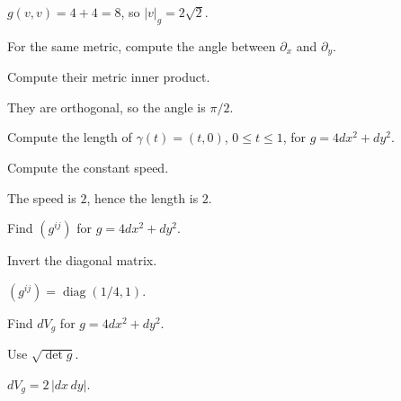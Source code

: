 \begin{solution}
\(g(v,v)=4+4=8\), so \(|v|_g=2\sqrt2\).
\end{solution}

\begin{exercise}[Angle]\label{exr:vii20-ped-02}
For the same metric, compute the angle between \(\partial_x\) and \(\partial_y\).
\end{exercise}

\begin{hint}
Compute their metric inner product.
\end{hint}

\begin{solution}
They are orthogonal, so the angle is \(\pi/2\).
\end{solution}

\begin{exercise}\label{exr:vii20-ped-03}
Compute the length of \(\gamma(t)=(t,0)\), \(0\le t\le1\), for \(g=4dx^2+dy^2\).
\end{exercise}

\begin{hint}
Compute the constant speed.
\end{hint}

\begin{solution}
The speed is \(2\), hence the length is \(2\).
\end{solution}

\begin{exercise}\label{exr:vii20-ped-04}
Find \((g^{ij})\) for \(g=4dx^2+dy^2\).
\end{exercise}

\begin{hint}
Invert the diagonal matrix.
\end{hint}

\begin{solution}
\((g^{ij})=\operatorname{diag}(1/4,1)\).
\end{solution}

\begin{exercise}\label{exr:vii20-ped-05}
Find \(dV_g\) for \(g=4dx^2+dy^2\).
\end{exercise}

\begin{hint}
Use \(\sqrt{\det g}\).
\end{hint}

\begin{solution}
\(dV_g=2\,|dx\,dy|\).
\end{solution}

